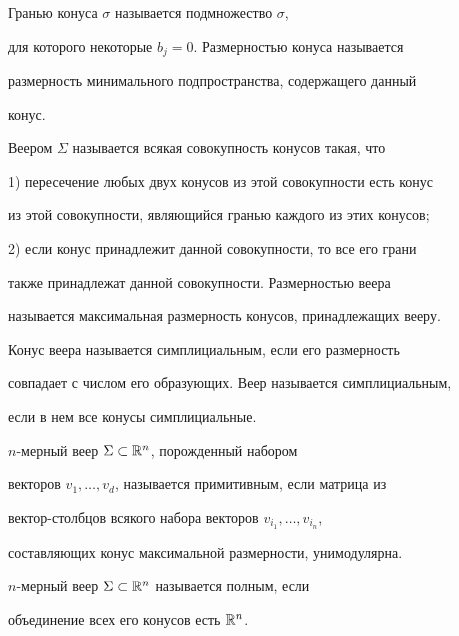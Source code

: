 Гранью конуса $\sigma$ называется подмножество $\sigma$,


для которого некоторые $b_j=0$. Размерностью конуса  называется


размерность минимального подпространства, содержащего данный


конус.


Веером $\Sigma$ называется всякая совокупность конусов такая, что


1) пересечение любых двух конусов из этой совокупности есть конус


из этой совокупности, являющийся гранью каждого из этих конусов;


2) если конус принадлежит данной совокупности, то все его грани


также принадлежат данной совокупности. Размерностью веера 


называется максимальная размерность конусов, принадлежащих вееру.








\begin{defn}


Конус веера  называется симплициальным, если его размерность


совпадает с числом его образующих. Веер называется симплициальным,


если в нем все конусы симплициальные.


\end{defn}








\begin{defn}


$n$-мерный веер $\Sigma\subset\Bbb{R}^n$, порожденный набором


векторов $v_1,\dotsc,v_d$, называется примитивным, если матрица из


вектор-столбцов всякого набора векторов $v_{i_1},\dotsc,v_{i_n}$,


составляющих конус максимальной размерности, унимодулярна.


\end{defn}








\begin{defn}


$n$-мерный веер $\Sigma\subset\Bbb{R}^n$ называется полным, если


объединение всех его конусов есть $\Bbb{R}^n$.


\end{defn}








